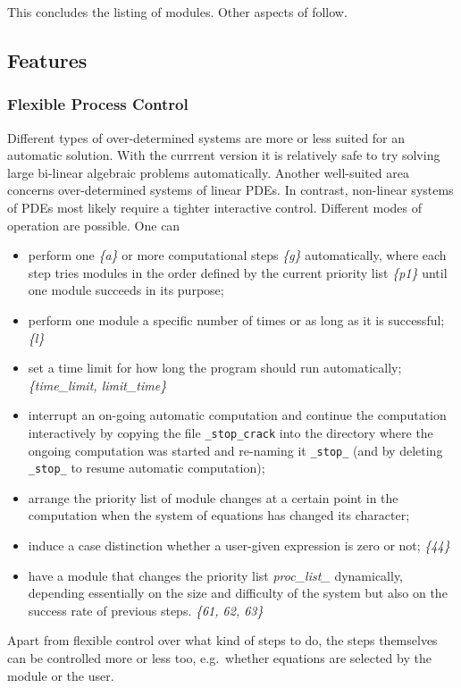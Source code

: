 This concludes the listing of modules.  Other aspects of
 follow.

\subsection{Features}

\subsubsection{Flexible Process Control}

Different types of over-determined systems are more or less suited for
an automatic solution.  With the currrent version it is relatively
safe to try solving large bi-linear algebraic problems automatically.
Another well-suited area concerns over-determined systems of linear
PDEs.  In contrast, non-linear systems of PDEs most likely require a
tighter interactive control.  Different modes of operation are
possible.  One can
\begin{itemize}
\item perform one \emph{\{a\}} or more computational steps
  \emph{\{g\}} automatically, where each step tries modules in the
  order defined by the current priority list \emph{\{p1\}} until one
  module succeeds in its purpose;
\item perform one module a specific number of times or as long as it
  is successful; \emph{\{l\}}
\item set a time limit for how long the program should run
  automatically; \emph{\{time\_limit, limit\_time\}}
\item interrupt an on-going automatic computation and continue the
  computation interactively by copying the file \texttt{\_stop\_crack}
  into the directory where the ongoing computation was started and
  re-naming it \texttt{\_stop\_} (and by deleting \texttt{\_stop\_} to
  resume automatic computation);
\item arrange the priority list of module changes at a certain point
  in the computation when the system of equations has changed its
  character;
\item induce a case distinction whether a user-given expression is
  zero or not; \emph{\{44\}}
\item have a module that changes the priority list \emph{proc\_list\_}
  dynamically, depending essentially on the size and difficulty of the
  system but also on the success rate of previous steps. \emph{\{61,
  62, 63\}}
\end{itemize}
Apart from flexible control over what kind of steps to do, the steps
themselves can be controlled more or less too, e.g.\ whether equations
are selected by the module or the user.

